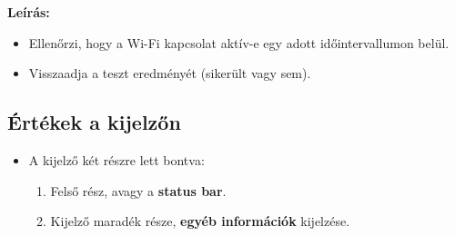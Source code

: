 \textbf{Leírás:}
\begin{itemize}
  \item Ellenőrzi, hogy a Wi-Fi kapcsolat aktív-e egy adott időintervallumon belül.
  \item Visszaadja a teszt eredményét (sikerült vagy sem).
\end{itemize}

\subsection{Értékek a kijelzőn}
\begin{itemize}
    \item A kijelző két részre lett bontva:
    \begin{enumerate}
        \item Felső rész, avagy a \textbf{status bar}.
        \item Kijelző maradék része, \textbf{egyéb információk} kijelzése.
    \end{enumerate}
\end{itemize}
